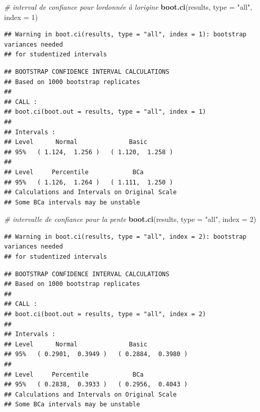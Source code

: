 \documentclass[
  12pt,
]{book}
\newenvironment{Shaded}{\begin{snugshade}}{\end{snugshade}}
\newcommand{\CommentTok}[1]{\textcolor[rgb]{0.56,0.35,0.01}{\textit{#1}}}
\newcommand{\DataTypeTok}[1]{\textcolor[rgb]{0.13,0.29,0.53}{#1}}
\newcommand{\DecValTok}[1]{\textcolor[rgb]{0.00,0.00,0.81}{#1}}
\newcommand{\KeywordTok}[1]{\textcolor[rgb]{0.13,0.29,0.53}{\textbf{#1}}}
\newcommand{\NormalTok}[1]{#1}
\newcommand{\StringTok}[1]{\textcolor[rgb]{0.31,0.60,0.02}{#1}}
\begin{document}
\begin{Shaded}
\begin{Highlighting}[]
\CommentTok{\# interval de confiance pour l\textquotesingle{}ordonnée à l\textquotesingle{}origine}
\KeywordTok{boot.ci}\NormalTok{(results, }\DataTypeTok{type =} \StringTok{"all"}\NormalTok{, }\DataTypeTok{index =} \DecValTok{1}\NormalTok{)}
\end{Highlighting}
\end{Shaded}

\begin{verbatim}
## Warning in boot.ci(results, type = "all", index = 1): bootstrap variances needed
## for studentized intervals
\end{verbatim}

\begin{verbatim}
## BOOTSTRAP CONFIDENCE INTERVAL CALCULATIONS
## Based on 1000 bootstrap replicates
## 
## CALL : 
## boot.ci(boot.out = results, type = "all", index = 1)
## 
## Intervals : 
## Level      Normal              Basic         
## 95%   ( 1.124,  1.256 )   ( 1.120,  1.258 )  
## 
## Level     Percentile            BCa          
## 95%   ( 1.126,  1.264 )   ( 1.111,  1.250 )  
## Calculations and Intervals on Original Scale
## Some BCa intervals may be unstable
\end{verbatim}

\begin{Shaded}
\begin{Highlighting}[]
\CommentTok{\# intervalle de confiance pour la pente}
\KeywordTok{boot.ci}\NormalTok{(results, }\DataTypeTok{type =} \StringTok{"all"}\NormalTok{, }\DataTypeTok{index =} \DecValTok{2}\NormalTok{)}
\end{Highlighting}
\end{Shaded}

\begin{verbatim}
## Warning in boot.ci(results, type = "all", index = 2): bootstrap variances needed
## for studentized intervals
\end{verbatim}

\begin{verbatim}
## BOOTSTRAP CONFIDENCE INTERVAL CALCULATIONS
## Based on 1000 bootstrap replicates
## 
## CALL : 
## boot.ci(boot.out = results, type = "all", index = 2)
## 
## Intervals : 
## Level      Normal              Basic         
## 95%   ( 0.2901,  0.3949 )   ( 0.2884,  0.3980 )  
## 
## Level     Percentile            BCa          
## 95%   ( 0.2838,  0.3933 )   ( 0.2956,  0.4043 )  
## Calculations and Intervals on Original Scale
## Some BCa intervals may be unstable
\end{verbatim}
\end{document}
